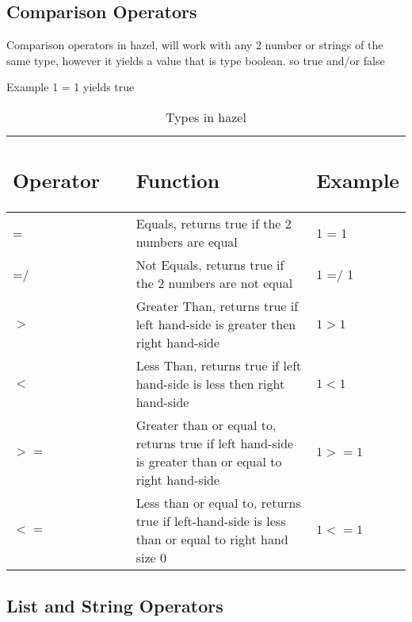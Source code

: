 \documentclass{article}
\begin{document}
\subsection{Comparison Operators}
Comparison operators in hazel, will work with any 2 number or strings of the same type, however it yields
a value that is type boolean. so true and/or false 

Example  1 = 1 yields true 

\begin{table}[H]
    \centering
    \begin{tabular}{p{0.35\linewidth} | p{0.6\linewidth}| p{0.6\linewidth} }
      
\subsection*{Operator} & \subsection*{Function} & \subsection*{Example}
 \\ \hline
      = & Equals, returns true if the 2 numbers are equal & 1 = 1 \\ \hline
      =/ & Not Equals, returns true if the 2 numbers are not equal & 1 =/ 1 \\ \hline
      $>$ & Greater Than, returns true if left hand-side is greater then right hand-side & $1 > 1$ \\ \hline
      $<$ & Less Than, returns true if left hand-side is less then right hand-side  & $1 < 1$ \\ \hline
      $>=$ & Greater than or equal to, returns true if left hand-side is greater than or equal to right hand-side  & $1 >= 1$\\ \hline
      $<=$ & Less than or equal to, returns true if left-hand-side is less than or equal to right hand size 0 & $1 <= 1$ \\ \hline
      
    \end{tabular}
        \caption{Types in hazel}
\end{table}


\subsection{List and String Operators}
\end{document}
